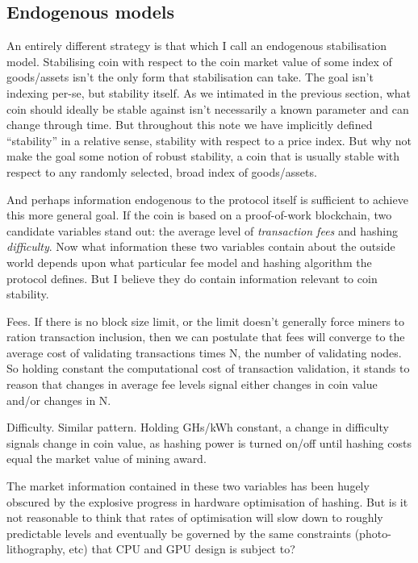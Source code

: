 \documentclass[twocolumn]{article}
\begin{document}
\subsection*{Endogenous models}
An entirely different strategy is that which I call an endogenous
stabilisation model. Stabilising coin with respect to the coin market
value of some index of goods/assets isn't the only form that
stabilisation can take. The goal isn't indexing per-se, but stability
itself. As we intimated in the previous section, what coin should
ideally be stable against isn't necessarily a known parameter and can
change through time. But throughout this note we have implicitly
defined ``stability'' in a relative sense, stability with respect to a
price index. But why not make the goal some notion of robust
stability, a coin that is usually stable with respect to any randomly
selected, broad index of goods/assets.

And perhaps information endogenous to the protocol itself is
sufficient to achieve this more general goal. If the coin is based on
a proof-of-work blockchain, two candidate variables stand out: the
average level of \emph{transaction fees} and hashing
\emph{difficulty}. Now what information these two variables contain
about the outside world depends upon what particular fee model and
hashing algorithm the protocol defines. But I believe they do contain
information relevant to coin stability. 

Fees. If there is no block size limit, or the limit doesn't generally
force miners to ration transaction inclusion, then we can postulate
that fees will converge to the average cost of validating transactions
times N, the number of validating nodes. So holding constant the
computational cost of transaction validation, it stands to reason that
changes in average fee levels signal either changes in coin value
and/or changes in N.

Difficulty. Similar pattern. Holding GHs/kWh constant, a change in
difficulty signals change in coin value, as hashing power is turned
on/off until hashing costs equal the market value of mining award. 

The market information contained in these two variables has been
hugely obscured by the explosive progress in hardware optimisation of
hashing. But is it not reasonable to think that rates of optimisation
will slow down to roughly predictable levels and eventually be
governed by the same constraints (photo-lithography, etc) that CPU and
GPU design is subject to? 
\end{document}
